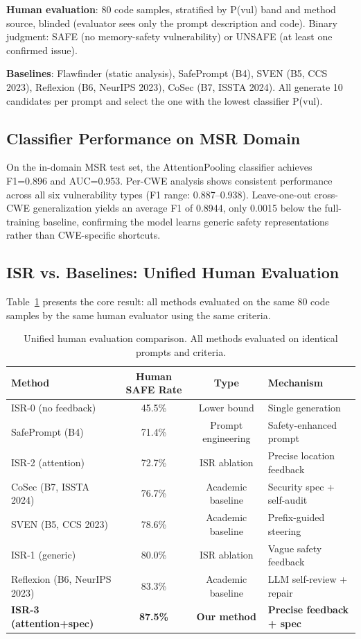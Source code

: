 \documentclass[sigconf,10pt]{acmart}
\begin{document}
\textbf{Human evaluation}: 80 code samples, stratified by P(vul) band and method source, blinded (evaluator sees only the prompt description and code). Binary judgment: SAFE (no memory-safety vulnerability) or UNSAFE (at least one confirmed issue).

\textbf{Baselines}: Flawfinder (static analysis), SafePrompt (B4), SVEN (B5, CCS 2023), Reflexion (B6, NeurIPS 2023), CoSec (B7, ISSTA 2024). All generate 10 candidates per prompt and select the one with the lowest classifier P(vul).

\subsection{Classifier Performance on MSR Domain}

On the in-domain MSR test set, the AttentionPooling classifier achieves F1=0.896 and AUC=0.953. Per-CWE analysis shows consistent performance across all six vulnerability types (F1 range: 0.887--0.938). Leave-one-out cross-CWE generalization yields an average F1 of 0.8944, only 0.0015 below the full-training baseline, confirming the model learns generic safety representations rather than CWE-specific shortcuts.

\subsection{ISR vs. Baselines: Unified Human Evaluation}

Table~\ref{tab:unified} presents the core result: all methods evaluated on the same 80 code samples by the same human evaluator using the same criteria.

\begin{table}[h]
\centering
\caption{Unified human evaluation comparison. All methods evaluated on identical prompts and criteria.}
\label{tab:unified}
\begin{tabular}{lccp{4cm}}
\toprule
Method & Human SAFE Rate & Type & Mechanism \\
\midrule
ISR-0 (no feedback) & 45.5\% & Lower bound & Single generation \\
SafePrompt (B4) & 71.4\% & Prompt engineering & Safety-enhanced prompt \\
ISR-2 (attention) & 72.7\% & ISR ablation & Precise location feedback \\
CoSec (B7, ISSTA 2024) & 76.7\% & Academic baseline & Security spec + self-audit \\
SVEN (B5, CCS 2023) & 78.6\% & Academic baseline & Prefix-guided steering \\
ISR-1 (generic) & 80.0\% & ISR ablation & Vague safety feedback \\
Reflexion (B6, NeurIPS 2023) & 83.3\% & Academic baseline & LLM self-review + repair \\
\textbf{ISR-3 (attention+spec)} & \textbf{87.5\%} & \textbf{Our method} & \textbf{Precise feedback + spec} \\
\bottomrule
\end{tabular}
\end{table}
\end{document}

